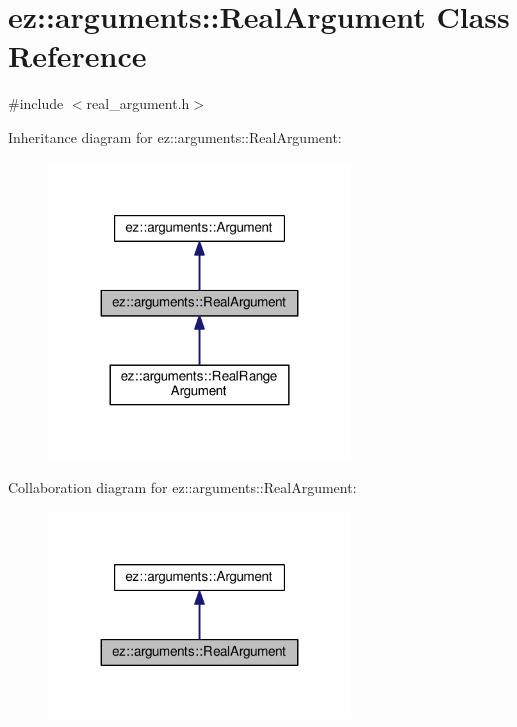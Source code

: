 \hypertarget{classez_1_1arguments_1_1RealArgument}{}\section{ez\+:\+:arguments\+:\+:Real\+Argument Class Reference}
\label{classez_1_1arguments_1_1RealArgument}


{\ttfamily \#include $<$real\+\_\+argument.\+h$>$}



Inheritance diagram for ez\+:\+:arguments\+:\+:Real\+Argument\+:
\nopagebreak
\begin{figure}[H]
\begin{center}
\leavevmode
\includegraphics[width=227pt]{classez_1_1arguments_1_1RealArgument__inherit__graph}
\end{center}
\end{figure}


Collaboration diagram for ez\+:\+:arguments\+:\+:Real\+Argument\+:
\nopagebreak
\begin{figure}[H]
\begin{center}
\leavevmode
\includegraphics[width=227pt]{classez_1_1arguments_1_1RealArgument__coll__graph}
\end{center}
\end{figure}
